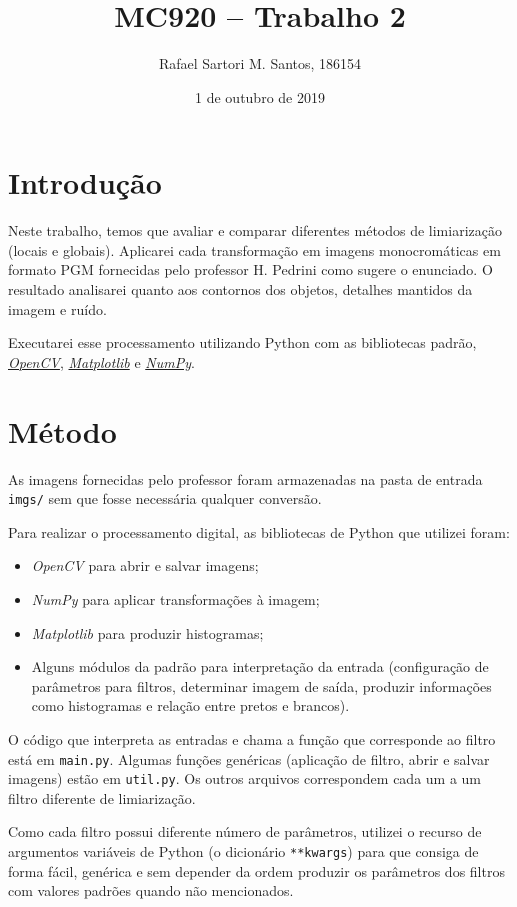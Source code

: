 \documentclass[brazilian,a4paper,twocolumn]{article}
\title{MC920 -- Trabalho 2}
\author{Rafael Sartori M. Santos, 186154}
\date{1 de outubro de 2019}
\begin{document}
\maketitle


\section{Introdução}

    Neste trabalho, temos que avaliar e comparar diferentes métodos de limiarização (locais e globais). Aplicarei cada transformação em imagens monocromáticas em formato PGM fornecidas pelo professor H. Pedrini como sugere o enunciado. O resultado analisarei quanto aos contornos dos objetos, detalhes mantidos da imagem e ruído.

    Executarei esse processamento utilizando Python com as bibliotecas padrão, \href{https://opencv.org/}{\emph{OpenCV}}, \href{https://matplotlib.org/}{\emph{Matplotlib}} e \href{https://numpy.org/}{\emph{NumPy}}.


\section{Método}

    As imagens fornecidas pelo professor foram armazenadas na pasta de entrada \texttt{imgs/} sem que fosse necessária qualquer conversão.

    Para realizar o processamento digital, as bibliotecas de Python que utilizei foram:
    \begin{itemize}
        \item \emph{OpenCV} para abrir e salvar imagens;
        \item \emph{NumPy} para aplicar transformações à imagem;
        \item \emph{Matplotlib} para produzir histogramas;
        \item Alguns módulos da padrão para interpretação da entrada (configuração de parâmetros para filtros, determinar imagem de saída, produzir informações como histogramas e relação entre pretos e brancos).
    \end{itemize}

    O código que interpreta as entradas e chama a função que corresponde ao filtro está em \texttt{main.py}. Algumas funções genéricas (aplicação de filtro, abrir e salvar imagens) estão em \texttt{util.py}. Os outros arquivos correspondem cada um a um filtro diferente de limiarização.

    Como cada filtro possui diferente número de parâmetros, utilizei o recurso de argumentos variáveis de Python (o dicionário \texttt{**kwargs}) para que consiga de forma fácil, genérica e sem depender da ordem produzir os parâmetros dos filtros com valores padrões quando não mencionados.
\end{document}
